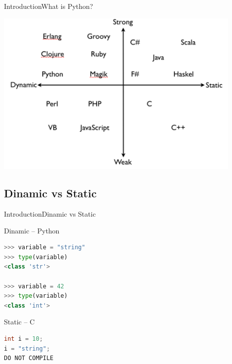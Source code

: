 \documentclass[10pt]{beamer}
\begin{document}
\begin{frame}{Introduction}{What is Python?}
	\begin{center}
		\includegraphics[width=0.9\textwidth]{pictures/1.png}
	\end{center}
\end{frame}



\subsection{Dinamic vs Static}

\begin{frame}[fragile]{Introduction}{Dinamic vs Static}
\begin{center}
\begin{block}{Dinamic -- Python}
			
\begin{lstlisting}[language=Python]
>>> variable = "string"
>>> type(variable)
<class 'str'>

>>> variable = 42
>>> type(variable)
<class 'int'>

\end{lstlisting}
\end{block}
		
\pause
		
\begin{block}{Static -- C}
			
\begin{lstlisting}[language=C]
int i = 10;
i = "string";
DO NOT COMPILE
\end{lstlisting}

\end{block}

\end{center}
\end{frame}
\end{document}
